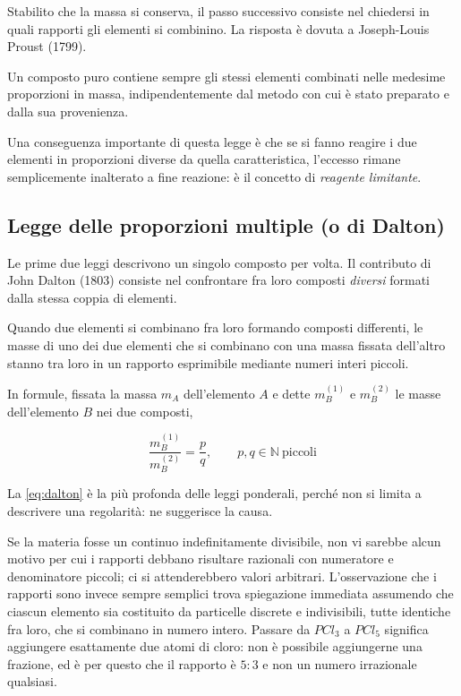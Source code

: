 Stabilito che la massa si conserva, il passo successivo consiste nel chiedersi in quali rapporti gli elementi si combinino. La risposta è dovuta a Joseph-Louis Proust (1799).
 
\begin{definizione}
    Un composto puro contiene sempre gli stessi elementi combinati nelle  medesime proporzioni in massa, indipendentemente dal metodo con cui è stato preparato e dalla sua provenienza.
\end{definizione}
 
Una conseguenza importante di questa legge è che se si fanno reagire i due elementi in proporzioni diverse da quella caratteristica, l'eccesso rimane semplicemente inalterato a fine reazione: è il concetto di \emph{reagente limitante}.
 
\subsection{Legge delle proporzioni multiple (o di Dalton)}
 
Le prime due leggi descrivono un singolo composto per volta. Il contributo di John Dalton (1803) consiste nel confrontare fra loro composti \emph{diversi} formati dalla stessa coppia di elementi.
 
\begin{definizione}
    Quando due elementi si combinano fra loro formando composti differenti,  le masse di uno dei due elementi che si combinano con una massa fissata dell'altro stanno tra loro in un rapporto esprimibile mediante numeri interi piccoli.
\end{definizione}
 
In formule, fissata la massa $m_A$ dell'elemento $A$ e dette $m_B^{(1)}$ e $m_B^{(2)}$ le masse dell'elemento $B$ nei due composti,

\begin{equation}
    \frac{m_B^{(1)}}{m_B^{(2)}} = \frac{p}{q}, \qquad p,q \in \mathbb{N} \ \text{piccoli}
    \label{eq:dalton}
\end{equation}

La \eqref{eq:dalton} è la più profonda delle leggi ponderali, perché non si limita a descrivere una regolarità: ne suggerisce la causa.
 
Se la materia fosse un continuo indefinitamente divisibile, non vi sarebbe alcun motivo per cui i rapporti debbano risultare razionali con numeratore e denominatore piccoli; ci si attenderebbero valori arbitrari. 
L'osservazione che i rapporti sono invece sempre semplici trova spiegazione immediata assumendo che ciascun elemento sia costituito da particelle discrete e indivisibili, tutte identiche fra loro, che si combinano in numero intero.
Passare da $PCl_3$ a $PCl_5$ significa aggiungere esattamente due atomi di cloro: non è possibile aggiungerne una frazione, ed è per questo che il rapporto è $5:3$ e non un numero irrazionale qualsiasi.
 
